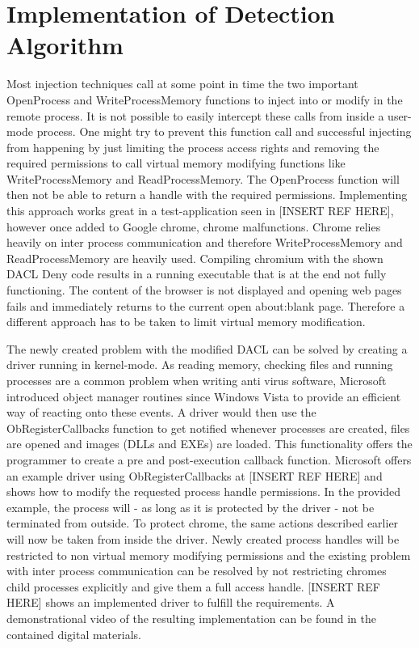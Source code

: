 \section{Implementation of Detection Algorithm}
\label{sec:implementation_dacl}
Most injection techniques call at some point in time the two important OpenProcess and WriteProcessMemory functions to inject into or modify in the remote process. It is not possible to easily intercept these calls from inside a user-mode process. One might try to prevent this function call and successful injecting from happening by just limiting the process access rights and removing the required permissions to call virtual memory modifying functions like WriteProcessMemory and ReadProcessMemory. The OpenProcess function will then not be able to return a handle with the required permissions. Implementing this approach works great in a test-application seen in [INSERT REF HERE], however once added to Google chrome, chrome malfunctions. Chrome relies heavily on inter process communication and therefore WriteProcessMemory and ReadProcessMemory are heavily used. Compiling chromium with the shown DACL Deny code results in a running executable that is at the end not fully functioning. The content of the browser is not displayed and opening web pages fails and immediately returns to the current open about:blank page. Therefore a different approach has to be taken to limit virtual memory modification.

The newly created problem with the modified DACL can be solved by creating a driver running in kernel-mode. As reading memory, checking files and running processes are a common problem when writing anti virus software, Microsoft introduced object manager routines since Windows Vista to provide an efficient way of reacting onto these events. A driver would then use the ObRegisterCallbacks function to get notified whenever processes are created, files are opened and images (DLLs and EXEs) are loaded. This functionality offers the programmer to create a pre and post-execution callback function. Microsoft offers an example driver using ObRegisterCallbacks at [INSERT REF HERE] and shows how to modify the requested process handle permissions. In the provided example, the process will - as long as it is protected by the driver - not be terminated from outside. To protect chrome, the same actions described earlier will now be taken from inside the driver. Newly created process handles will be restricted to non virtual memory modifying permissions and the existing problem with inter process communication can be resolved by not restricting chromes child processes explicitly and give them a full access handle. [INSERT REF HERE] shows an implemented driver to fulfill the requirements. A demonstrational video of the resulting implementation can be found in the contained digital materials.

